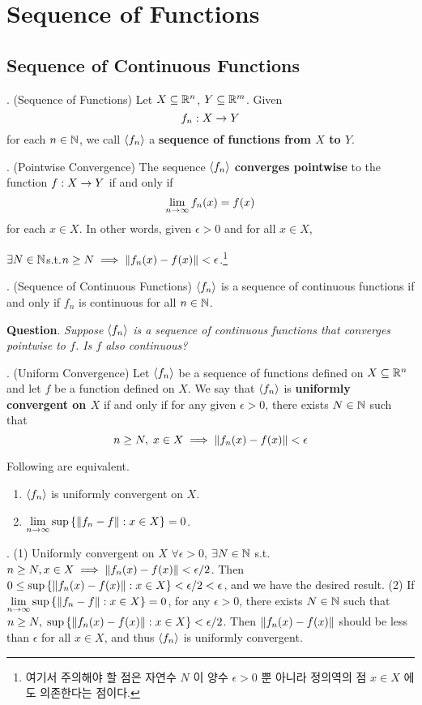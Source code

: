 \chapter{Sequence of Functions}

\section{Sequence of Continuous Functions}

. (Sequence of Functions) Let \(X \subseteq \mathbb{R}^n\), \(Y \subseteq \mathbb{R}^m\). Given
\[
	f_n: X\rightarrow Y
\]
for each \(n\in \mathbb{N}\), we call \(\left\langle f_n \right\rangle\) a \textbf{sequence of functions from \(X\) to \(Y\)}.

. (Pointwise Convergence) The sequence \(\left\langle f_n \right\rangle\) \textbf{converges pointwise} to the function \(f: X \rightarrow Y\) if and only if
\[
	\lim_{n\rightarrow \infty} f_n(x) = f(x)
\]
for each \(x \in X\). In other words, given \(\epsilon > 0\) and for all \(x \in X\),
\begin{center}
	\(\exists N\in \mathbb{N}\)\quad  s.t.\quad \(n \geq N \implies \left\lVert f_n(x) - f(x)\right\rVert < \epsilon\).\footnote{여기서 주의해야 할 점은 자연수 \(N\) 이 양수 \(\epsilon > 0\) 뿐 아니라 정의역의 점 \(x\in X\) 에도 의존한다는 점이다.}
\end{center}

. (Sequence of Continuous Functions) \(\left\langle f_n \right\rangle\) is a sequence of continuous functions if and only if \(f_n\) is continuous for all \(n\in \mathbb{N}\).

\textbf{Question}. \textit{Suppose \(\left\langle f_n \right\rangle\) is a sequence of continuous functions that converges pointwise to \(f\). Is \(f\) also continuous?}

. (Uniform Convergence) Let \(\left\langle f_n \right\rangle\) be a sequence of functions defined on \(X \subseteq \mathbb{R}^n\) and let \(f\) be a function defined on \(X\). We say that \(\left\langle f_n \right\rangle\) is \textbf{uniformly convergent on \(X\)} if and only if for any given \(\epsilon > 0\), there exists \(N\in \mathbb{N}\) such that
\[
	n\geq N,\; x\in X \implies \left\lVert f_n(x) - f(x)\right\rVert < \epsilon
\]

\clearpage
{} Following are equivalent.
\begin{enumerate}
	\item \(\left\langle f_n \right\rangle\) is uniformly convergent on \(X\).
	\item \(\displaystyle \lim_{n\rightarrow \infty} \sup \left\{\left\lVert f_n-f\right\rVert: x\in X\right\} = 0\).
\end{enumerate}

\pf. (1) Uniformly convergent on \(X\) \mimp \(\forall \epsilon > 0\), \(\exists N \in \mathbb{N}\) s.t. \(n \geq N, x\in X \implies \left\lVert f_n(x) - f(x)\right\rVert < \epsilon/2\). Then \(0 \leq \sup\left\{\left\lVert f_n(x) - f(x)\right\rVert : x \in X \right\} < \epsilon/2 < \epsilon\), and we have the desired result.
(2) If \(\displaystyle \lim_{n\rightarrow \infty} \sup \left\{\left\lVert f_n-f\right\rVert: x\in X\right\} = 0\), for any \(\epsilon > 0\), there exists \(N\in \mathbb{N}\) such that \(n\geq N,\; \sup\left\{\left\lVert f_n(x) - f(x)\right\rVert : x \in X \right\} < \epsilon / 2\). Then \(\left\lVert f_n(x) - f(x)\right\rVert\) should be less than \(\epsilon\) for all \(x\in X\), and thus \(\left\langle f_n \right\rangle\) is uniformly convergent.

